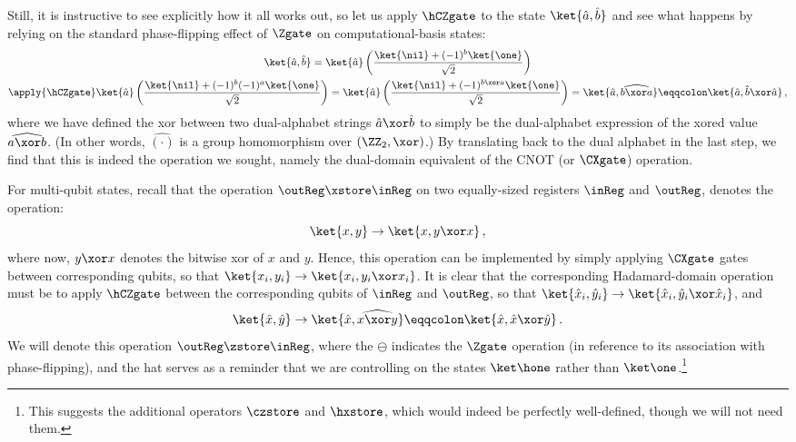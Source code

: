       Still, it is instructive to see explicitly how it all works out, so let us apply
        $\hCZgate$ to the state $\ket{\hat a, \hat b}$ and see what happens
        by relying on the standard phase-flipping effect of $\Zgate$ on
        computational-basis states:
      \begin{multline*}
        \ket{\hat a, \hat b} 
          = \ket{\hat a} \left( \frac{\ket{\nil} + (-1)^b \ket{\one}}{\sqrt 2} \right) \\
          \apply{\hCZgate} \ket{\hat a} \left( \frac{\ket{\nil} + (-1)^b(-1)^a \ket{\one}}{\sqrt 2} \right) 
          = \ket{\hat a} \left( \frac{\ket{\nil} + (-1)^{b \xor a} \ket{\one}}{\sqrt 2} \right)
          = \ket{\hat a, \widehat{b \xor a}} \eqqcolon \ket{\hat a, \hat{b} \xor \hat{a}}\, ,
      \end{multline*}
      where we have defined the xor between two dual-alphabet strings 
        $\hat a \xor \hat b$ to simply be the dual-alphabet expression of the
        xored value $\widehat{a \xor b}$. (In other words,
        $\widehat{(\cdot)}$ is
        a group homomorphism over $(\ZZ_2, \xor)$.) By translating back to the dual
        alphabet in the last step, we find that this is indeed the operation we
        sought, namely the dual-domain equivalent of the CNOT (or $\CXgate$) operation. 

      For multi-qubit states, recall that the operation 
        $\outReg \xstore \inReg$ on two equally-sized registers $\inReg$ and
        $\outReg$, denotes the operation:
        \[
          \ket{x,y} \to \ket{x,y \xor x}\, ,
        \]
        where now, $y \xor x$ denotes the bitwise xor of $x$ and $y$.
        Hence, this operation can be implemented by simply applying $\CXgate$
        gates between corresponding qubits, so that $\ket{x_i,y_i} \to \ket{x_i,
        y_i \xor x_i}$. It is clear that the corresponding
        Hadamard-domain operation must be to apply $\hCZgate$ between
        the corresponding qubits of $\inReg$ and $\outReg$, so that 
        $\ket{\hat{x}_i, \hat{y}_i} \to \ket{\hat{x}_i, \hat{y}_i \xor
        \hat{x}_i}$, and
        \[
          \ket{\hat x, \hat y} \to \ket{\hat x, \widehat{x \xor y}} 
          \eqqcolon \ket{\hat x, \hat{x} \xor \hat{y}}\, . 
        \]
        We will denote this operation $\outReg \zstore \inReg$, where the $\ominus$
        indicates the $\Zgate$ operation (in reference to its association with
        phase-flipping), and the hat serves as a reminder that we are
        controlling on the states $\ket\hone$ rather than $\ket\one$.\footnote{
          This suggests the additional operators $\czstore$ and $\hxstore$, which
          would indeed be perfectly well-defined, though we will not need them.
        }

